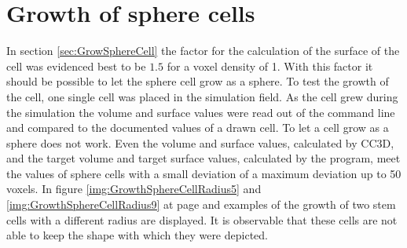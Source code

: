 \section{Growth of sphere cells}\label{sec:GrowSphereCells}
In section \ref{sec:GrowSphereCell} the factor for the calculation of the surface of the cell was evidenced best to be $1.5$ for a voxel density of 1. With this factor it should be possible to let the sphere cell grow as a sphere. To test the growth of the cell, one single cell was placed in the simulation field. As the cell grew during the simulation the volume and surface values were read out of the command line and compared to the documented values of a drawn cell. \newline
To let a cell grow as a sphere does not work. Even the volume and surface values, calculated by \ac{CC3D}, and the target volume and target surface values, calculated by the program, meet the values of sphere cells with a small deviation of a maximum deviation up to 50 voxels. \newline
In figure \ref{img:GrowthSphereCellRadius5} and \ref{img:GrowthSphereCellRadius9} at page \pageref{img:GrowthSphereCellRadius5} and \pageref{img:GrowthSphereCellRadius9} examples of the growth of two stem cells with a different radius are displayed. It is observable that these cells are not able to keep the shape with which they were depicted.


